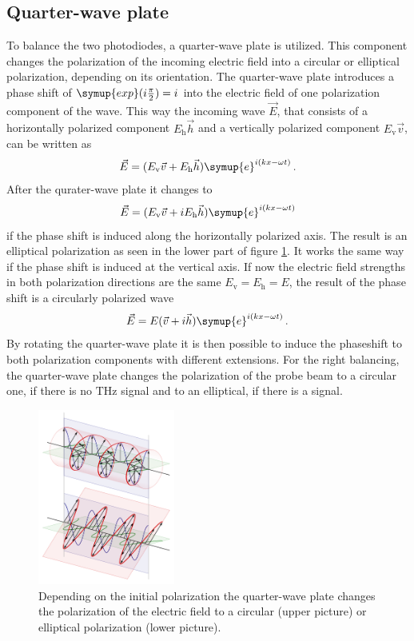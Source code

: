 \subsection{Quarter-wave plate}
\label{sec:qwp}
To balance the two photodiodes, a quarter-wave plate is utilized.
This component changes the polarization of the incoming electric field into a circular or elliptical polarization, depending on its orientation.
The quarter-wave plate introduces a phase shift of $\symup{exp}(i\frac{\pi}{2}) = i$ into the electric field of one polarization component of the wave.
This way the incoming wave $\vec{E}$, that consists of a horizontally polarized component $E_\text{h}\vec{h}$ and a vertically polarized component $E_\text{v}\vec{v}$, can be written as
\begin{equation}
    \vec{E} = (E_\text{v}\vec{v} + E_\text{h}\vec{h})\symup{e}^{i(kx-\omega t)} \, .
\end{equation}
After the qurater-wave plate it changes to 
\begin{equation}
    \vec{E} = (E_\text{v}\vec{v} + i E_\text{h}\vec{h})\symup{e}^{i(kx-\omega t)}
\end{equation}
if the phase shift is induced along the horizontally polarized axis.
The result is an elliptical polarization as seen in the lower part of figure \ref{fig:qwp}.
It works the same way if the phase shift is induced at the vertical axis.
If now the electric field strengths in both polarization directions are the same $E_\text{v} = E_\text{h} = E$, the result of the phase shift is a circularly polarized wave \cite{qwp_book}
\begin{equation}
    \vec{E} = E(\vec{v} + i\vec{h})\symup{e}^{i(kx-\omega t)} \, .
\end{equation}
By rotating the quarter-wave plate it is then possible to induce the phaseshift to both polarization components with different extensions.
For the right balancing, the quarter-wave plate changes the polarization of the probe beam to a circular one, if there is no $\si{\tera\hertz}$ signal and to an elliptical, if there is a signal.
\begin{figure}
    \centering
    \includegraphics[width=0.4\textwidth]{refferenced_pic/qwp.png}
    \caption{Depending on the initial polarization the quarter-wave plate changes the polarization of the electric field to a circular (upper picture) or elliptical polarization (lower picture).}
    \label{fig:qwp}
\end{figure}
\FloatBarrier
